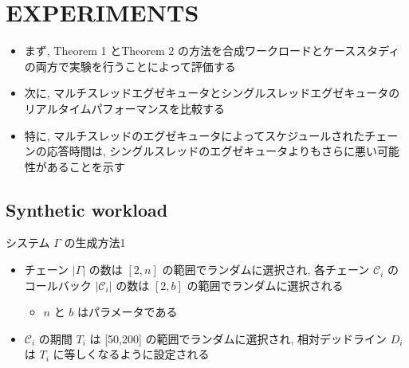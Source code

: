 
\section{EXPERIMENTS}
\label{sec: experiments}


\begin{frame}{}
    \begin{itemize}
        \item まず, Theorem 1 とTheorem 2 の方法を合成ワークロードとケーススタディの両方で実験を行うことによって評価する
        \item 次に, マルチスレッドエグゼキュータとシングルスレッドエグゼキュータのリアルタイムパフォーマンスを比較する
        \item 特に, マルチスレッドのエグゼキュータによってスケジュールされたチェーンの応答時間は, シングルスレッドのエグゼキュータよりもさらに悪い可能性があることを示す
    \end{itemize}
\end{frame}


\subsection{Synthetic workload}
\label{ssec: synthetic workload}

\begin{frame}{システム $\Gamma$ の生成方法1}
    \begin{itemize}
        \item チェーン $|\Gamma|$ の数は $[2, n]$ の範囲でランダムに選択され, 各チェーン $\mathcal{C}_{i}$ のコールバック $\left|\mathcal{C}_{i}\right|$ の数は $[2, b]$ の範囲でランダムに選択される
              \begin{itemize}
                  \item $n$ と $b$ はパラメータである
              \end{itemize}
        \item $\mathcal{C}_{i}$ の期間 $T_{i}$ は [50,200] の範囲でランダムに選択され, 相対デッドライン $D_{i}$ は $T_{i}$ に等しくなるように設定される
    \end{itemize}
\end{frame}

